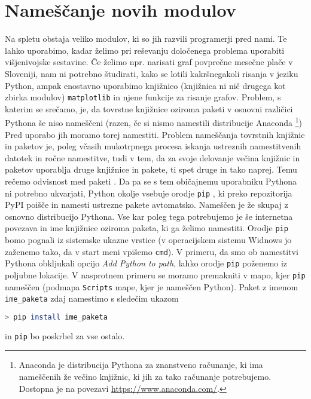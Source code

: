 \section{Nameščanje novih modulov}
Na spletu obstaja veliko modulov, ki so jih razvili programerji pred nami. Te lahko uporabimo, kadar želimo pri reševanju določenega problema uporabiti višjenivojske sestavine. Če želimo npr. narisati graf povprečne mesečne plače v Sloveniji, nam ni potrebno študirati, kako se lotili kakršnegakoli risanja v jeziku Python, ampak enostavno uporabimo knjižnico (knjižnica ni nič drugega kot zbirka modulov) \texttt{matplotlib} in njene funkcije za risanje grafov. Problem, s katerim se srečamo, je, da tovrstne knjižnice oziroma paketi v osnovni različici Pythona še niso nameščeni (razen, če si nismo namestili distribucije Anaconda \footnote{Anaconda je distribucija Pythona za znanstveno računanje, ki ima nameščenih že večino knjižnic, ki jih za tako računanje potrebujemo. Dostopna je na povezavi \url{https://www.anaconda.com/}.}) Pred uporabo jih moramo torej namestiti. Problem nameščanja tovrstnih knjižnic in paketov je, poleg včasih mukotrpnega procesa iskanja ustreznih namestitvenih datotek in ročne namestitve, tudi v tem, da za svoje delovanje večina knjižnic in paketov uporablja druge knjižnice in pakete, ti spet druge in tako naprej. Temu rečemo odvisnost med paketi . Da pa se s tem običajnemu uporabniku Pythona ni potrebno ukvarjati, Python okolje vsebuje orodje \texttt{pip} , ki preko repozitorija PyPI  poišče in namesti ustrezne pakete avtomatsko. Nameščen je že skupaj z osnovno distribucijo Pythona. Vse kar poleg tega potrebujemo je še internetna povezava in ime knjižnice oziroma paketa, ki ga želimo namestiti. Orodje \texttt{pip} bomo pognali iz sistemske ukazne vrstice (v operacijskem sistemu Widnows jo zaženemo tako, da v start meni vpišemo \texttt{cmd}). V primeru, da smo ob namestitvi Pythona obkljukali opcijo \emph{Add Python to path}, lahko orodje \texttt{pip} poženemo iz poljubne lokacije. V nasprotnem primeru se moramo premakniti v mapo, kjer \texttt{pip} nameščen (podmapa \texttt{Scripts} mape, kjer je nameščen Python). Paket z imenom \texttt{ime\_paketa}  zdaj namestimo s sledečim ukazom
\begin{lstlisting}[language=bash]
> pip install ime_paketa
\end{lstlisting}
in \texttt{pip} bo poskrbel za vse ostalo.






